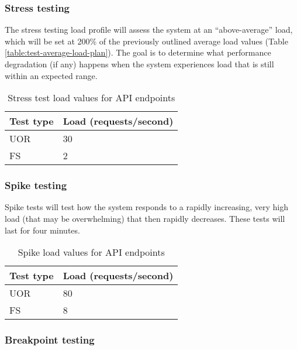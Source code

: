 \subsubsection{Stress testing}

The stress testing load profile will assess the system at an ``above-average'' load, which will be set at 200\% of the previously outlined average load values (Table \ref{table:test-average-load-plan}). The goal is to determine what performance degradation (if any) happens when the system experiences load that is still within an expected range.

\begin{table}[h]
    \centering
    \begin{tabularx}{\textwidth}{|X|X|}
        \hline
        \textbf{Test type} & \textbf{Load (requests/second)}  \\ \hline
        UOR & 30 \\ \hline
        FS & 2 \\ \hline
    \end{tabularx}
    \caption{Stress test load values for API endpoints}
    \label{table:test-stress-load-plan}
\end{table}

\subsubsection{Spike testing}

Spike tests will test how the system responds to a rapidly increasing, very high load (that may be overwhelming) that then rapidly decreases. These tests will last for four minutes.

\begin{table}[h]
    \centering
    \begin{tabularx}{\textwidth}{|X|X|}
        \hline
        \textbf{Test type} & \textbf{Load (requests/second)}  \\ \hline
        UOR & 80 \\ \hline
        FS & 8 \\ \hline
    \end{tabularx}
    \caption{Spike load values for API endpoints}
    \label{table:test-spike-load-plan}
\end{table}

\subsubsection{Breakpoint testing}

